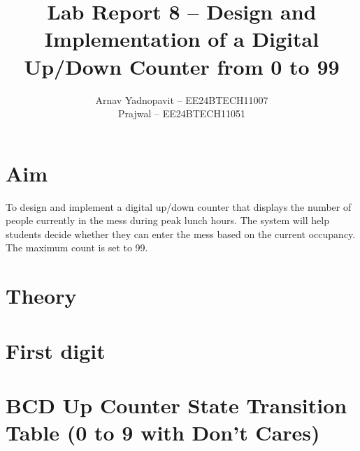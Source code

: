 \documentclass{article}
\title{\textbf{Lab Report 8 – Design and Implementation of a Digital Up/Down Counter from 0 to 99}}
\author{
    Arnav Yadnopavit -- EE24BTECH11007\\
    Prajwal -- EE24BTECH11051
    }
\date{}
\begin{document}
    
    \maketitle
    \section{Aim}
    To design and implement a digital up/down counter that displays the number of people currently
in the mess during peak lunch hours. The system will help students decide whether they can enter
the mess based on the current occupancy. The maximum count is set to 99.
    \section{Theory}
    \section*{First digit}
    \section*{BCD Up Counter State Transition Table (0 to 9 with Don't Cares)}
    
\end{document}
